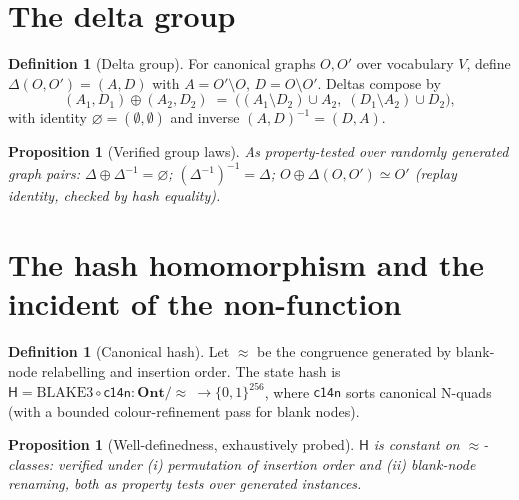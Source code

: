 \documentclass[11pt,a4paper]{report}
\newtheorem{proposition}[theorem]{Proposition}
\theoremstyle{definition}
\newtheorem{definition}[theorem]{Definition}
\theoremstyle{remark}
\newcommand{\Ont}{\mathbf{Ont}}
\newcommand{\Hash}{\mathsf{H}}
\newcommand{\canon}{\mathsf{c14n}}
\newcommand{\del}{\Delta}
\begin{document}
\section{The delta group}

\begin{definition}[Delta group]\label{def:delta}
For canonical graphs $O, O'$ over vocabulary $V$, define
$\del(O,O') = (A, D)$ with $A = O' \setminus O$, $D = O \setminus O'$.
Deltas compose by
\[
  (A_1, D_1) \oplus (A_2, D_2)
  \;=\;
  \bigl( (A_1 \setminus D_2) \cup A_2,\; (D_1 \setminus A_2) \cup D_2 \bigr),
\]
with identity $\varnothing = (\emptyset,\emptyset)$ and inverse
$(A,D)^{-1} = (D,A)$.
\end{definition}

\begin{proposition}[Verified group laws]\label{prop:group}
As property-tested over randomly generated graph pairs:
$\del \oplus \del^{-1} = \varnothing$;\quad
$(\del^{-1})^{-1} = \del$;\quad
$O \oplus \del(O,O') \simeq O'$ (replay identity, checked by hash equality).
\end{proposition}

\section{The hash homomorphism and the incident of the non-function}

\begin{definition}[Canonical hash]
Let $\approx$ be the congruence generated by blank-node relabelling and
insertion order. The state hash is
$\Hash = \mathrm{BLAKE3} \circ \canon : \Ont/\!\approx\ \to \{0,1\}^{256}$,
where $\canon$ sorts canonical N-quads (with a bounded colour-refinement pass
for blank nodes).
\end{definition}

\begin{proposition}[Well-definedness, exhaustively probed]
$\Hash$ is constant on $\approx$-classes: verified under (i) permutation of
insertion order and (ii) blank-node renaming, both as property tests over
generated instances.
\end{proposition}
\end{document}
